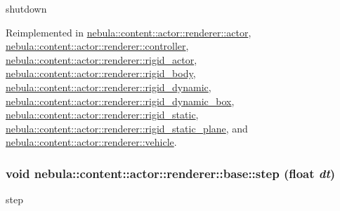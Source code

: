 shutdown 

Reimplemented in \hyperlink{classnebula_1_1content_1_1actor_1_1renderer_1_1actor_a3c051be72600dbc471e16e3c6ff53c52}{nebula::content::actor::renderer::actor}, \hyperlink{classnebula_1_1content_1_1actor_1_1renderer_1_1controller_aef42654ff81b3b0b39b532b3441cc518}{nebula::content::actor::renderer::controller}, \hyperlink{classnebula_1_1content_1_1actor_1_1renderer_1_1rigid__actor_a9d1be32a4ba87de355247219e4e9f104}{nebula::content::actor::renderer::rigid\_\-actor}, \hyperlink{classnebula_1_1content_1_1actor_1_1renderer_1_1rigid__body_a24b3051c9db06008d8698cc97eff21e0}{nebula::content::actor::renderer::rigid\_\-body}, \hyperlink{classnebula_1_1content_1_1actor_1_1renderer_1_1rigid__dynamic_a6c0f68639544063b7a7bf404fdbc1370}{nebula::content::actor::renderer::rigid\_\-dynamic}, \hyperlink{classnebula_1_1content_1_1actor_1_1renderer_1_1rigid__dynamic__box_a45f52d77d1f89e86d5ac3cd2d0beb4c0}{nebula::content::actor::renderer::rigid\_\-dynamic\_\-box}, \hyperlink{classnebula_1_1content_1_1actor_1_1renderer_1_1rigid__static_a33ba501805701c5069344a5126830898}{nebula::content::actor::renderer::rigid\_\-static}, \hyperlink{classnebula_1_1content_1_1actor_1_1renderer_1_1rigid__static__plane_ac0d85518481b3d6fc0d15402c6878ed9}{nebula::content::actor::renderer::rigid\_\-static\_\-plane}, and \hyperlink{classnebula_1_1content_1_1actor_1_1renderer_1_1vehicle_a3fb75f250202b758a8963b7c2e8a8f38}{nebula::content::actor::renderer::vehicle}.\hypertarget{classnebula_1_1content_1_1actor_1_1renderer_1_1base_afaa86ca71b54c9d548b073f0cf23a41b}{
\subsubsection[{step}]{\setlength{\rightskip}{0pt plus 5cm}void nebula::content::actor::renderer::base::step (float {\em dt})}}
\label{classnebula_1_1content_1_1actor_1_1renderer_1_1base_afaa86ca71b54c9d548b073f0cf23a41b}


step 

